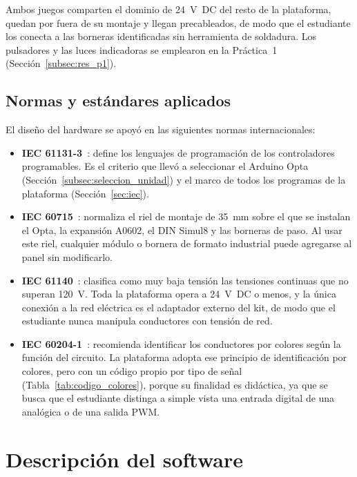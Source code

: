 \documentclass[12pt,a4paper,oneside]{report}
\begin{document}
Ambos juegos comparten el dominio de 24~V~DC del resto de la plataforma, quedan por fuera de su montaje y llegan precableados, de modo que el estudiante los conecta a las borneras identificadas sin herramienta de soldadura. Los pulsadores y las luces indicadoras se emplearon en la Práctica~1 (Sección~\ref{subsec:res_p1}).

\subsection{Normas y estándares aplicados}
\label{subsec:hw_normas}

El diseño del hardware se apoyó en las siguientes normas internacionales:

\begin{itemize}
    \item \textbf{IEC 61131-3}~\cite{ref38}: define los lenguajes de programación de los controladores programables. Es el criterio que llevó a seleccionar el Arduino Opta (Sección~\ref{subsec:seleccion_unidad}) y el marco de todos los programas de la plataforma (Sección~\ref{sec:iec}).
    \item \textbf{IEC 60715}~\cite{ref39}: normaliza el riel de montaje de 35~mm sobre el que se instalan el Opta, la expansión A0602, el DIN Simul8 y las borneras de paso. Al usar este riel, cualquier módulo o bornera de formato industrial puede agregarse al panel sin modificarlo.
    \item \textbf{IEC 61140}~\cite{ref41}: clasifica como muy baja tensión las tensiones continuas que no superan 120~V. Toda la plataforma opera a 24~V~DC o menos, y la única conexión a la red eléctrica es el adaptador externo del kit, de modo que el estudiante nunca manipula conductores con tensión de red.
    \item \textbf{IEC 60204-1}~\cite{ref40}: recomienda identificar los conductores por colores según la función del circuito. La plataforma adopta ese principio de identificación por colores, pero con un código propio por tipo de señal (Tabla~\ref{tab:codigo_colores}), porque su finalidad es didáctica, ya que se busca que el estudiante distinga a simple vista una entrada digital de una analógica o de una salida PWM.
\end{itemize}

\section{Descripción del software}
\label{sec:software}
\end{document}
